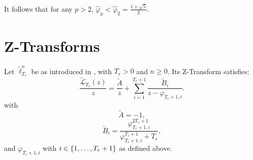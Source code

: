 \documentclass{article}
\begin{document}
    \begin{remark}
     It follows that for any $p > 2$, $\hat{\varphi}_p < \hat{\varphi}_2 = \frac{1 + \sqrt{5}}{2}$.
    \end{remark}

    \section{Z-Transforms}

    \begin{theorem} \label{thm:1-mainz}
      Let $\tilde{\ell}_{T_r}^{n}$ be as introduced in , with $T_r > 0$ and $n \geq 0$. 
      Its Z-Transform satisfies:
      \begin{equation}
        \frac{\tilde{\mathcal{L}}_{T_r}(z)}{z} = \frac{\tilde{A}}{z} + \sum_{i=1}^{T_r + 1} \frac{\tilde{B}_i}{z - \varphi_{T_r + 1, i}}.
      \end{equation}
      with 
      \begin{equation}
        \tilde{A} = -1,
      \end{equation}
      \begin{equation}
        \tilde{B}_i = \frac{\varphi_{T_r + 1, i}^{2T_r + 1}}{\varphi_{T_r + 1, i}^{T_r + 1} + T_r},
      \end{equation}
      and $\varphi_{T_r + 1, i}$ with $i \in \{1, \dots, T_r + 1\}$ as defined above.
    \end{theorem}
\end{document}
